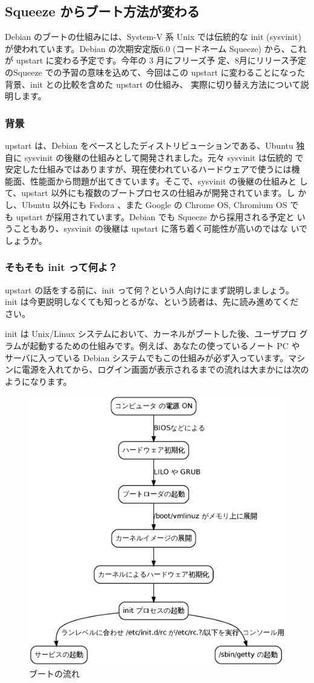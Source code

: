 \documentclass[mingoth,a4paper]{jsarticle}
\begin{document}
\subsection{Squeeze からブート方法が変わる}
Debian のブートの仕組みには、System-V 系 Unix では伝統的な init
(sysvinit) が使われています。Debian の次期安定版6.0 (コードネーム
Squeeze) から、これが upstart に変わる予定です。今年の 3 月にフリーズ予
定、8月にリリース予定のSqueeze での予習の意味を込めて、今回はこの
upstart に変わることになった背景、init との比較を含めた upstart の仕組み、
実際に切り替え方法について説明します。

\subsubsection{背景}

upstart は、Debian をベースとしたディストリビューションである、Ubuntu 独
自に sysvinit の後継の仕組みとして開発されました。元々 sysvinit は伝統的
で安定した仕組みではありますが、現在使われているハードウェアで使うには機
能面、性能面から問題が出てきています。そこで、sysvinit の後継の仕組みと
して、upstart 以外にも複数のブートプロセスの仕組みが開発されています。し
かし、Ubuntu 以外にも Fedora 、また Google の Chrome OS, Chromium OS で
も upstart が採用されています。Debian でも Squeeze から採用される予定と
いうこともあり、sysvinit の後継は upstart に落ち着く可能性が高いのではな
いでしょうか。

\subsubsection{そもそも init って何よ？}

upstart の話をする前に、init って何？という人向けにまず説明しましょう。
init は今更説明しなくても知っとるがな、という読者は、先に読み進めてくだ
さい。

init は Unix/Linux システムにおいて、カーネルがブートした後、ユーザプロ
グラムが起動するための仕組みです。例えば、あなたの使っているノート PC や
サーバに入っている Debian システムでもこの仕組みが必ず入っています。マシ
ンに電源を入れてから、ログイン画面が表示されるまでの流れは大まかには次の
ようになります。

\begin{figure}[H]
\caption{ブートの流れ}
\begin{center}
\includegraphics[height=0.5\hsize]{image201002/sysvinit.eps}
\end{center}
\end{figure}
\end{document}
